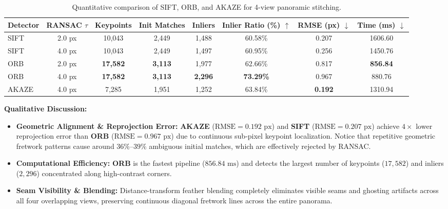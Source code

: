 \documentclass[a4paper,12pt]{article}
\begin{document}
\begin{table}[H]
\centering
\caption{Quantitative comparison of SIFT, ORB, and AKAZE for 4-view panoramic stitching.}
\label{tab:part_c}
\footnotesize
\begin{tabular}{lccccccc}
\toprule
\textbf{Detector} & \textbf{RANSAC $\tau$} & \textbf{Keypoints} & \textbf{Init Matches} & \textbf{Inliers} & \textbf{Inlier Ratio (\%)} $\uparrow$ & \textbf{RMSE (px)} $\downarrow$ & \textbf{Time (ms)} $\downarrow$ \\
\midrule
SIFT & 2.0 px & 10,043 & 2,449 & 1,488 & 60.58\% & 0.207 & 1606.60 \\
SIFT & 4.0 px & 10,043 & 2,449 & 1,497 & 60.95\% & 0.256 & 1450.76 \\
ORB & 2.0 px & \textbf{17,582} & \textbf{3,113} & 1,977 & 62.66\% & 0.817 & \textbf{856.84} \\
ORB & 4.0 px & \textbf{17,582} & \textbf{3,113} & \textbf{2,296} & \textbf{73.29\%} & 0.967 & 880.76 \\
AKAZE & 4.0 px & 7,285 & 1,951 & 1,252 & 63.84\% & \textbf{0.192} & 1310.94 \\
\bottomrule
\end{tabular}
\end{table}

\textbf{Qualitative Discussion:}
\begin{itemize}
    \item \textbf{Geometric Alignment \& Reprojection Error:} \textbf{AKAZE} ($\text{RMSE}=0.192\text{ px}$) and \textbf{SIFT} ($\text{RMSE}=0.207\text{ px}$) achieve $4\times$ lower reprojection error than \textbf{ORB} ($\text{RMSE}=0.967\text{ px}$) due to continuous sub-pixel keypoint localization. Notice that repetitive geometric fretwork patterns cause around $36\%$--$39\%$ ambiguous initial matches, which are effectively rejected by RANSAC.
    \item \textbf{Computational Efficiency:} \textbf{ORB} is the fastest pipeline ($856.84\text{ ms}$) and detects the largest number of keypoints ($17,582$) and inliers ($2,296$) concentrated along high-contrast corners.
    \item \textbf{Seam Visibility \& Blending:} Distance-transform feather blending completely eliminates visible seams and ghosting artifacts across all four overlapping views, preserving continuous diagonal fretwork lines across the entire panorama.
\end{itemize}
\end{document}
